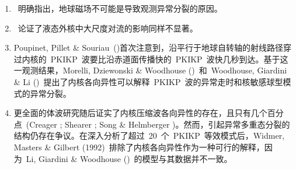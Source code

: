 \begin{enumerate}
\item

\textcite{tanimoto89}~明确指出，地球磁场不可能是导致观测异常分裂的原因。
\item

\textcite{gilbert94}~论证了液态外核中大尺度对流的影响同样不显著。
\item

Poupinet, Pillet \& Souriau~(\citeyear{poupinet&al83})首次注意到，沿平行于地球自转轴的射线路径穿过内核的~PKIKP~波要比沿赤道面传播快的~PKIKP~波快几秒到达。基于这一观测结果，Morelli, Dziewonski
\& Woodhouse (\citeyear{morelli&al86})~和~Woodhouse,
Giardini \& Li (\citeyear{woodhouse&al86})~提出了内核各向异性可以解释~PKIKP~波的异常走时和核敏感球型模式的异常分裂。
\item

更全面的体波研究随后证实了内核压缩波各向异性的存在，且只有几个百分点~(Creager \citeyear{creager92};
Shearer \citeyear{shearer94}; Song \& Helmberger
\citeyear{song&helmberger95})。然而，引起异常多重态分裂的结构仍存在争议。在深入分析了超过~20~个~PKIKP~等效模式后，Widmer, Masters \& Gilbert (1992)~排除了内核各向异性作为一种可行的解释，因为~Li, Giardini \& Woodhouse (\citeyear{li&al91})~的模型与其数据并不一致。
\end{enumerate}

